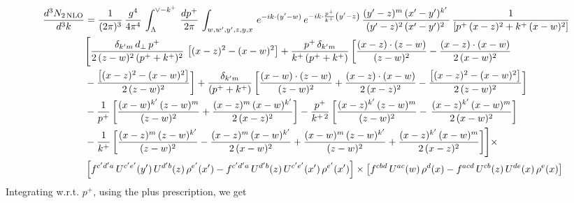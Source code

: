 \documentclass[9pt]{article}
\numberwithin{equation}{section}
\begin{document}
\begin{align}
 \frac{d^{3}N_{2\,\rm NLO}}{d^{3}k} & =  \frac{1}{(2\pi)^{3}}\,\frac{g^{4}}{4\pi^{4}}\,\int_{\Lambda}^{\vee-k^{+}}\, \frac{dp^{+}}{2\pi}\,\int_{w,w',y',z,y,x}\, e^{-ik\cdot (y'-w)}\,e^{-ik\cdot \frac{p^{+}}{k^{+}}\left(y'-z\right)}\, \frac{(y'-z)^{m}\,(x'-y')^{k'}\,}{(y'-z)^{2}\,(x'-y')^{2}\,}\, \frac{1}{\left[p^{+}\,(x-z)^{2}+k^{+}\,(x-w)^{2}\right]}\notag \\ & \Bigg[\frac{\delta_{k'm}\,d_{\perp}\,p^{+}}{2\,(z-w)^{2}\,(p^{+}+k^{+})^{2}}\, \left[(x-z)^{2}-(x-w)^{2}\right]+\frac{p^{+}\,\delta_{k'm}}{k^{+}\,(p^{+}+k^{+})}\,\bigg[\frac{(x-z)\cdot (z-w)}{(z-w)^{2}} -\frac{(x-z)\cdot (x-w)}{2\,(x-w)^{2}}\notag \\ & -\frac{\left[(x-z)^{2}-(x-w)^{2}\right]}{2\,(z-w)^{2}}\bigg] +\frac{\delta_{k'm}}{(p^{+}+k^{+})}\,\bigg[\frac{(x-w)\cdot (z-w)}{(z-w)^{2}}+\frac{(x-z)\cdot (x-w)}{2\,(x-z)^{2}} -\frac{\left[(x-z)^{2}-(x-w)^{2}\right]}{2\,(z-w)^{2}}\bigg]\notag \\ & -\frac{1}{p^{+}}\,\bigg[\frac{(x-w)^{k'}\,(z-w)^{m}}{(z-w)^{2}}+\frac{(x-z)^{m}\,(x-w)^{k'}}{2\,(x-z)^{2}}\bigg]-\frac{p^{+}}{k^{+\,2}}\,\bigg[\frac{(x-z)^{k'}\,(z-w)^{m}}{(z-w)^{2}} -\,\frac{(x-z)^{k'}\,(x-w)^{m}}{2\,(x-w)^{2}}\bigg]\notag \\ & -\frac{1}{k^{+}}\,\bigg[\frac{(x-z)^{m}\,(z-w)^{k'}}{(z-w)^{2}}-\frac{(x-z)^{m}\,(x-w)^{k'}}{2\,(x-w)^{2}}+\frac{(x-w)^{m}\,(z-w)^{k'}}{(z-w)^{2}} +\frac{(x-z)^{k'}\,(x-w)^{m}}{2\,(x-z)^{2}}\bigg]\Bigg]\times\,\notag \\ & \left[f^{c'd'a}\,U^{c'e'}(y')\,U^{d'b}(z)\,\rho^{e'}(x')-f^{c'd'a}\, 
    U^{d'b}(z)\,U^{c'e'}(x')\,\rho^{e'}(x')\right]\times \left[f^{cbd}\,U^{ac}(w)\,\rho^{d}(x) -f^{acd}\,U^{cb}(z)\,U^{de}(x)\,\rho^{e}(x)\right]
\end{align}
Integrating w.r.t. $p^{+}$, using the plus prescription, we get
\end{document}
